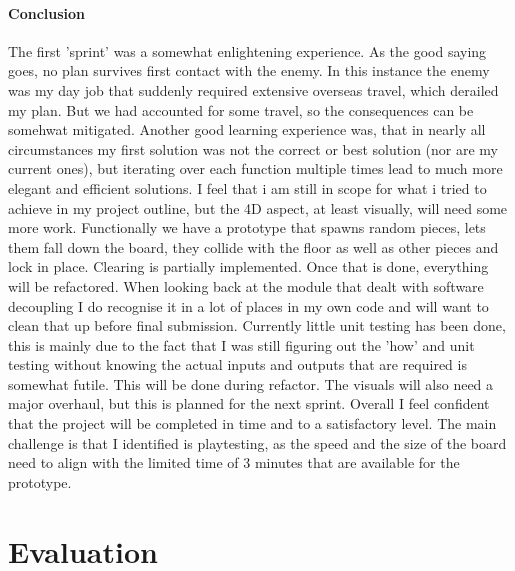 \documentclass{article}
\begin{document}
\paragraph{Conclusion}
The first 'sprint' was a somewhat enlightening experience. As the good saying goes, no plan survives first contact with the enemy. 
In this instance the enemy was my day job that suddenly required extensive overseas travel, which derailed my plan. But we had accounted for some travel, so the consequences can be somehwat mitigated. 
Another good learning experience was, that in nearly all circumstances my first solution was not the correct or best solution (nor are my current ones), but iterating over each function multiple times lead to much more elegant and efficient solutions. 
I feel that i am still in scope for what i tried to achieve in my project outline, but the 4D aspect, at least visually, will need some more work. 
Functionally we have a prototype that spawns random pieces, lets them fall down the board, they collide with the floor as well as other pieces and lock in place. Clearing is partially implemented. Once that is done, everything will be refactored. When looking back at the module that dealt with software decoupling I do recognise it in a lot of places in my own code and will want to clean that up before final submission.
Currently little unit testing has been done, this is mainly due to the fact that I was still figuring out the 'how' and unit testing without knowing the actual inputs and outputs that are required is somewhat futile. This will be done during refactor.
The visuals will also need a major overhaul, but this is planned for the next sprint.
Overall I feel confident that the project will be completed in time and to a satisfactory level. The main challenge is that I identified is playtesting, as the speed and the size of the board need to align with the limited time of 3 minutes that are available for the prototype.

\section{Evaluation}
\end{document}
